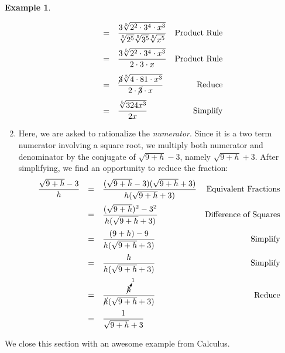 \documentclass[11pt]{article}
\theoremstyle{definition}  %
\newtheorem{ex}{\bf Example}
\begin{document}
\begin{ex}
\begin{enumerate}
\[\begin{array}{rclr}
													& = & \dfrac{3 \sqrt[5]{2^2 \cdot 3^4 \cdot x^3}}{\sqrt[5]{2^5} \sqrt[5]{3^5}\sqrt[5]{x^5}} & \text{Product Rule}\\[12pt]
                          & = & \dfrac{3 \sqrt[5]{2^2 \cdot 3^4\cdot x^3}}{2 \cdot 3 \cdot x} & \text{Product Rule}\\[12pt]
													& = & \dfrac{\cancel{3} \sqrt[5]{4 \cdot 81\cdot x^3}}{2 \cdot \cancel{3} \cdot x} & \text{Reduce}\\[12pt]
													& = & \dfrac{\sqrt[5]{324x^3}}{2x} & \text{Simplify}\\
													\end{array}\]
													
\item  Here, we are asked to rationalize the \textit{numerator}.  Since it is a two term numerator involving a square root, we multiply both numerator and denominator by the conjugate of $\sqrt{9 + h} - 3$, namely $\sqrt{9 + h} + 3$.  After simplifying, we find an opportunity to reduce the fraction:\[\begin{array}{rclr}

\dfrac{\sqrt{9 + h} - 3}{h} & = & \dfrac{(\sqrt{9 + h} - 3)(\sqrt{9 + h} + 3)}{h(\sqrt{9 + h} + 3)} & \text{Equivalent Fractions} \\[12pt]

                             & = & \dfrac{(\sqrt{9+h})^2 - 3^2}{h(\sqrt{9 + h} + 3)} & \text{Difference of Squares} \\[12pt]
														 & = & \dfrac{(9+h) - 9}{h(\sqrt{9 + h} + 3)} & \text{Simplify} \\[12pt]
														 & = & \dfrac{h}{h(\sqrt{9 + h} + 3)} & \text{Simplify} \\[12pt]
														 & = & \dfrac{\cancelto{1}{h}}{\cancel{h}(\sqrt{9 + h} + 3)} & \text{Reduce}\\[12pt]
														& = & \dfrac{1}{\sqrt{9 + h} + 3} & \\

\end{array} \]

\end{enumerate}

\end{ex}

We close this section with an awesome example from Calculus.%
\end{document}
